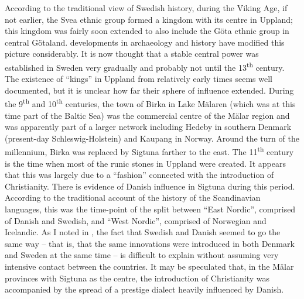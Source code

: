 According to the traditional view of Swedish history, during the Viking Age, if not earlier, the Svea ethnic group formed a kingdom with its centre in Uppland; this kingdom was fairly soon extended to also include the Göta ethnic group in central Götaland. developments in archaeology and history have modified this picture considerably. It is now thought that a stable central power was established in Sweden very gradually and probably not until the 13\textsuperscript{th} century. The existence of “kings” in Uppland from relatively early times seems well documented, but it is unclear how far their sphere of influence extended. During the 9\textsuperscript{th} and 10\textsuperscript{th} centuries, the town of Birka in Lake Mälaren (which was at this time part of the Baltic Sea) was the commercial centre of the Mälar region and was apparently part of a larger network including Hedeby in southern Denmark (present-day Schleswig-Holstein) and Kaupang in Norway. Around the turn of the millennium, Birka was replaced by Sigtuna farther to the east. The 11\textsuperscript{th} century is the time when most of the runic stones in Uppland were created. It appears that this was largely due to a “fashion” connected with the introduction of Christianity. There is evidence of Danish influence in Sigtuna during this period. According to the traditional account of the history of the Scandinavian languages, this was the time-point of the split between “East Nordic”, comprised of Danish and Swedish, and “West Nordic”, comprised of Norwegian and Icelandic. As I noted in \citet{Dahl2001}, the fact that Swedish and Danish seemed to go the same way – that is, that the same innovations were introduced in both Denmark and Sweden at the same time – is difficult to explain without assuming very intensive contact between the countries. It may be speculated that, in the Mälar provinces with Sigtuna as the centre, the introduction of Christianity was accompanied by the spread of a prestige dialect heavily influenced by Danish. 



